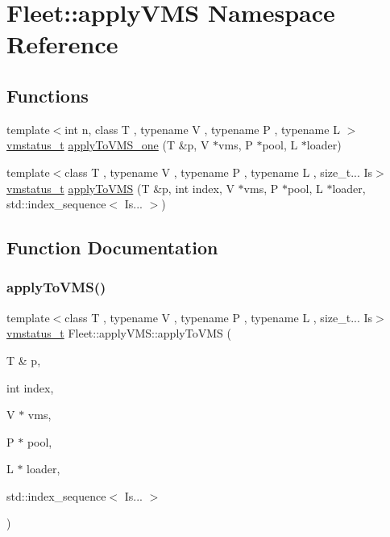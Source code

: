 \hypertarget{namespace_fleet_1_1apply_v_m_s}{}\section{Fleet\+:\+:apply\+V\+MS Namespace Reference}
\label{namespace_fleet_1_1apply_v_m_s}
\subsection*{Functions}
\begin{DoxyCompactItemize}
\item 
{\footnotesize template$<$int n, class T , typename V , typename P , typename L $>$ }\\\hyperlink{_instruction_8h_a6202215407ab29590bb936ca2996cf64}{vmstatus\+\_\+t} \hyperlink{namespace_fleet_1_1apply_v_m_s_a7961ca5a819b4db7e4261f7ff18d272d}{apply\+To\+V\+M\+S\+\_\+one} (T \&p, V $\ast$vms, P $\ast$pool, L $\ast$loader)
\item 
{\footnotesize template$<$class T , typename V , typename P , typename L , size\+\_\+t... Is$>$ }\\\hyperlink{_instruction_8h_a6202215407ab29590bb936ca2996cf64}{vmstatus\+\_\+t} \hyperlink{namespace_fleet_1_1apply_v_m_s_a7309104b033509b889fd07bff2dc5ff4}{apply\+To\+V\+MS} (T \&p, int index, V $\ast$vms, P $\ast$pool, L $\ast$loader, std\+::index\+\_\+sequence$<$ Is... $>$)
\end{DoxyCompactItemize}


\subsection{Function Documentation}
\mbox{\label{namespace_fleet_1_1apply_v_m_s_a7309104b033509b889fd07bff2dc5ff4}} 
\subsubsection{\texorpdfstring{apply\+To\+V\+M\+S()}{applyToVMS()}}
{\footnotesize\ttfamily template$<$class T , typename V , typename P , typename L , size\+\_\+t... Is$>$ \\
\hyperlink{_instruction_8h_a6202215407ab29590bb936ca2996cf64}{vmstatus\+\_\+t} Fleet\+::apply\+V\+M\+S\+::apply\+To\+V\+MS (\begin{DoxyParamCaption}\item[{T \&}]{p,  }\item[{int}]{index,  }\item[{V $\ast$}]{vms,  }\item[{P $\ast$}]{pool,  }\item[{L $\ast$}]{loader,  }\item[{std\+::index\+\_\+sequence$<$ Is... $>$}]{ }\end{DoxyParamCaption})\hspace{0.3cm}{\ttfamily [inline]}}

